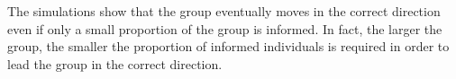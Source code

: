 The simulations show that the group eventually moves in the correct direction even if only a small proportion of the group is informed. In fact, the larger the group, the smaller the proportion of informed individuals is required in order to lead the group in the correct direction. 
